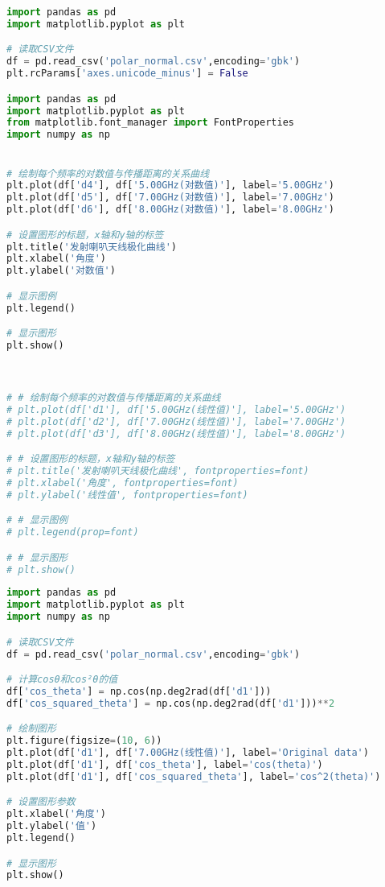 \documentclass[12pt,hyperref,a4paper,UTF8]{ctexart}
\begin{document}
\begin{lstlisting}[language=Python, caption=代码3]
import pandas as pd
import matplotlib.pyplot as plt

# 读取CSV文件
df = pd.read_csv('polar_normal.csv',encoding='gbk')
plt.rcParams['axes.unicode_minus'] = False

import pandas as pd
import matplotlib.pyplot as plt
from matplotlib.font_manager import FontProperties
import numpy as np


# 绘制每个频率的对数值与传播距离的关系曲线
plt.plot(df['d4'], df['5.00GHz(对数值)'], label='5.00GHz')
plt.plot(df['d5'], df['7.00GHz(对数值)'], label='7.00GHz')
plt.plot(df['d6'], df['8.00GHz(对数值)'], label='8.00GHz')

# 设置图形的标题，x轴和y轴的标签
plt.title('发射喇叭天线极化曲线')
plt.xlabel('角度')
plt.ylabel('对数值')

# 显示图例
plt.legend()

# 显示图形
plt.show()



# # 绘制每个频率的对数值与传播距离的关系曲线
# plt.plot(df['d1'], df['5.00GHz(线性值)'], label='5.00GHz')
# plt.plot(df['d2'], df['7.00GHz(线性值)'], label='7.00GHz')
# plt.plot(df['d3'], df['8.00GHz(线性值)'], label='8.00GHz')

# # 设置图形的标题，x轴和y轴的标签
# plt.title('发射喇叭天线极化曲线', fontproperties=font)
# plt.xlabel('角度', fontproperties=font)
# plt.ylabel('线性值', fontproperties=font)

# # 显示图例
# plt.legend(prop=font)

# # 显示图形
# plt.show()

\end{lstlisting}



\begin{lstlisting}[language=Python, caption=代码4]
import pandas as pd
import matplotlib.pyplot as plt
import numpy as np

# 读取CSV文件
df = pd.read_csv('polar_normal.csv',encoding='gbk')

# 计算cosθ和cos²θ的值
df['cos_theta'] = np.cos(np.deg2rad(df['d1']))
df['cos_squared_theta'] = np.cos(np.deg2rad(df['d1']))**2

# 绘制图形
plt.figure(figsize=(10, 6))
plt.plot(df['d1'], df['7.00GHz(线性值)'], label='Original data')
plt.plot(df['d1'], df['cos_theta'], label='cos(theta)')
plt.plot(df['d1'], df['cos_squared_theta'], label='cos^2(theta)')

# 设置图形参数
plt.xlabel('角度')
plt.ylabel('值')
plt.legend()

# 显示图形
plt.show()
\end{lstlisting}
\end{document}
